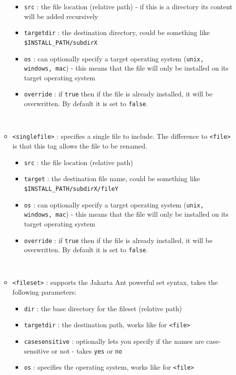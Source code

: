 \begin{itemize}
\begin{itemize}
\begin{itemize}
      \item \texttt{src} : the file location (relative path) - if this is a
      directory its content will be added recursively
      \item \texttt{targetdir} : the destination directory, could be something
      like \texttt{\$INSTALL\_PATH/subdirX}
      \item \texttt{os} : can optionally specify a target operating system
      (\texttt{unix, windows, mac}) - this means that the file will only be
      installed on its target operating system
      \item \texttt{override} : if \texttt{true} then if the file is already
      installed, it will be overwritten. By default it is set to
      \texttt{false}.
    
    \end{itemize}\
    \item \texttt{<singlefile>} : specifies a single file to include. The difference to \texttt{<file>} is that this tag allows the file to be renamed.
    \begin{itemize}
    
      \item \texttt{src} : the file location (relative path)
      \item \texttt{target} : the destination file name, could be something
      like \texttt{\$INSTALL\_PATH/subdirX/fileY}
      \item \texttt{os} : can optionally specify a target operating system
      (\texttt{unix, windows, mac}) - this means that the file will only be
      installed on its target operating system
      \item \texttt{override} : if \texttt{true} then if the file is already
      installed, it will be overwritten. By default it is set to
      \texttt{false}.
    
    \end{itemize}\
    \item \texttt{<fileset>} : supports the Jakarta Ant powerful set syntax,
    takes the following parameters:
    \begin{itemize}
    
      \item \texttt{dir} : the base directory for the fileset (relative path)
      \item \texttt{targetdir} : the destination path, works like for
      \texttt{<file>}
      \item \texttt{casesensitive} : optionally lets you specify if the names
      are case-sensitive or not - takes \texttt{yes} or \texttt{no}
      \item \texttt{os} : specifies the operating system, works like for
      \texttt{<file>}
    

\end{itemize}
\end{itemize}
\end{itemize}
